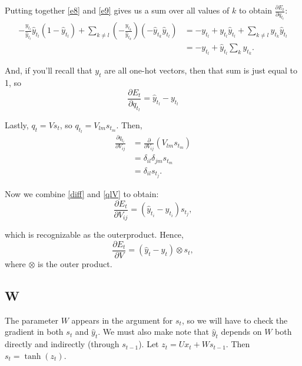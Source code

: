 \documentclass[11pt,twoside]{article}
\begin{document}
\noindent Putting together \eqref{e8} and \eqref{e9} gives us a sum over all values of $k$ to obtain $\frac{\partial E_t}{\partial q_{t_l}}$:
\begin{subequations}
\begin{align}
-\frac{y_{t_l}}{\hat{y}_{t_l}}\hat{y}_{t_l}\left(1-\hat{y}_{t_l}\right)+\sum_{k\ne l}{}\left(-\frac{y_{t_k}}{\hat{y}_{t_k}}\right)\left(-\hat{y}_{t_k}\hat{y}_{t_l}\right) 
&= -y_{t_l}+y_{t_l}\hat{y}_{t_l}+\sum_{k\ne l}{}y_{t_k}\hat{y}_{t_l} \\
&= -y_{t_l} + \hat{y}_{t_l}\sum_{k}{}y_{t_k}.
\end{align}
\end{subequations}

\noindent And, if you'll recall that $y_t$ are all one-hot vectors, then that sum is just equal to 1, so
\begin{equation}
\label{diff}
\frac{\partial E_t}{\partial q_{t_l}}=\hat{y}_{t_l}-y_{t_l}
\end{equation}


\noindent Lastly, $q_t=V s_t$, so $q_{t_l}=V_{l m}s_{t_m}$. Then,
\begin{subequations}
\begin{align}
\frac{\partial q_{t_l}}{\partial V_{i j}} &= \frac{\partial }{\partial V_{i j}}\left(V_{l m} s_{t_m}\right) \\
	&= \delta_{i l}\delta_{j m}s_{t_m} \\
\label{qlV}
	&= \delta_{i l}s_{t_j}.
\end{align}
\end{subequations}

\noindent Now we combine \eqref{diff} and \eqref{qlV} to obtain:
\begin{equation}
\frac{\partial E_t}{\partial V_{i j}}=\left(\hat{y}_{t_i}-y_{t_i}\right) s_{t_j},
\end{equation}

\noindent which is recognizable as the outerproduct. Hence,
\begin{equation}
\frac{\partial E_t}{\partial V}=\left(\hat{y}_t-y_t\right) \otimes s_t,
\end{equation}
\noindent where $\otimes$ is the outer product.

\subsection{W}
The parameter $W$ appears in the argument for $s_t$, so we will have to check the gradient in both $s_t$ and $\hat{y}_t$. We must also make note that $\hat{y}_t$ depends on $W$ both directly and indirectly (through $s_{t-1}$). Let $z_t=Ux_t+Ws_{t-1}$. Then $s_t=\tanh(z_t)$.
\end{document}

